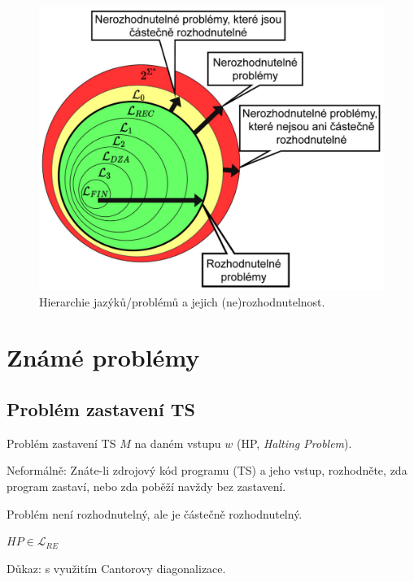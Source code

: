 
\begin{figure}[H]
    \centering
    \includegraphics[width=0.9\linewidth]{fj_hierarchy.pdf}
    \caption{Hierarchie jazýků/problémů a jejich (ne)rozhodnutelnost.}
\end{figure}


\section{Známé problémy}

\subsection*{Problém zastavení TS}

\begin{compactitem}
    \item Problém zastavení TS $M$ na daném vstupu $w$ (HP, \textit{Halting Problem}).

    \item Neformálně: Znáte-li zdrojový kód programu (TS) a jeho vstup, rozhodněte, zda program zastaví, nebo zda poběží navždy bez zastavení.

    \item Problém není rozhodnutelný, ale je částečně rozhodnutelný. \begin{compactitem}
        \item $HP \in \mathcal{L}_{RE}$
        \item Důkaz: s využitím Cantorovy diagonalizace.
    \end{compactitem}

\end{compactitem}

